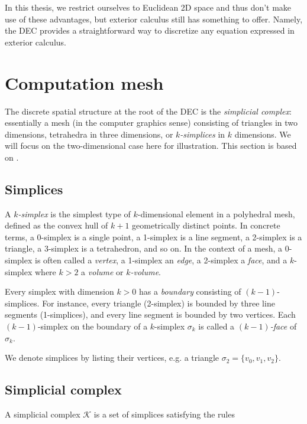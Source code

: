 \documentclass[utf8,english]{gradu3}
\begin{document}
In this thesis, we restrict ourselves to Euclidean 2D space
and thus don't make use of these advantages,
but exterior calculus still has something to offer.
Namely, the DEC provides a straightforward way
to discretize any equation expressed in exterior calculus.


\section{Computation mesh}

The discrete spatial structure at the root of the DEC is the \textit{simplicial complex}:
essentially a mesh (in the computer graphics sense)
consisting of triangles in two dimensions,
tetrahedra in three dimensions, or \textit{$k$-simplices} in $k$ dimensions.
We will focus on the two-dimensional case here for illustration.
This section is based on \parencite{desbrun_discrete_2006}.


\subsection{Simplices}

A \textit{$k$-simplex} is the simplest type of $k$-dimensional element
in a polyhedral mesh, defined as
the convex hull of $k + 1$ geometrically distinct points.
In concrete terms, a 0-simplex is a single point,
a 1-simplex is a line segment, a 2-simplex is a triangle,
a 3-simplex is a tetrahedron, and so on.
In the context of a mesh, a 0-simplex is often called a \textit{vertex},
a 1-simplex an \textit{edge}, a 2-simplex a \textit{face},
and a $k$-simplex where $k > 2$ a \textit{volume} or \textit{$k$-volume}.

Every simplex with dimension $k > 0$
has a \textit{boundary} consisting of $(k-1)$-simplices.
For instance, every triangle (2-simplex) is bounded by three line segments (1-simplices),
and every line segment is bounded by two vertices.
Each $(k-1)$-simplex on the boundary of a $k$-simplex $\sigma_k$
is called a \textit{$(k-1)$-face} of $\sigma_k$.

We denote simplices by listing their vertices, e.g. a triangle
$\sigma_2 = \{v_0, v_1, v_2\}$.


\subsection{Simplicial complex}

A simplicial complex $\mathcal{K}$ is a set of simplices satisfying the rules
\end{document}
